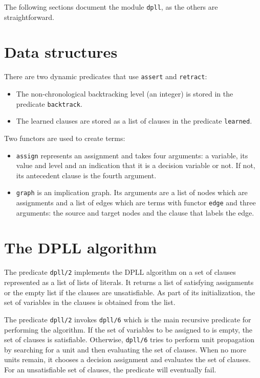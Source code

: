 \documentclass[11pt]{report}
\newcommand*{\p}[1]{\textup{\texttt{#1}}}
\begin{document}
The following sections document the module \p{dpll}, as the others are
straightforward.

\newpage

\section{Data structures}

There are two dynamic predicates that use \p{assert} and \p{retract}:
\begin{itemize}
\item The non-chronological backtracking level (an integer) is stored in the
predicate \p{backtrack}.

\item The learned clauses are stored as a list of
clauses in the predicate \p{learned}.
\end{itemize}

Two functors are used to create terms:
\begin{itemize}

\item \p{assign} represents an assignment and takes four arguments: a
variable, its value and level and an indication that it is a decision
variable or not. If not, its antecedent clause is the fourth argument.

\item \p{graph} is an implication graph. Its arguments are a list of
nodes which are assignments and a list of edges which are terms with
functor \p{edge} and three arguments: the source and target nodes
and the clause that labels the edge.
\end{itemize}


\section{The DPLL algorithm}

The predicate \p{dpll/2} implements the DPLL algorithm on a set of
clauses represented as a list of lists of literals. It returns a list of
satisfying assignments or the empty list if the clauses are
unsatisfiable. As part of its initialization, the set of variables in
the clauses is obtained from the list.

The predicate \p{dpll/2} invokes \p{dpll/6} which is the main recursive
predicate for performing the algorithm. If the set of variables to be
assigned to is empty, the set of clauses is satisfiable. Otherwise,
\p{dpll/6} tries to perform unit propagation by searching for a unit and
then evaluating the set of clauses. When no more units remain, it
chooses a decision assignment and evaluates the set of clauses.
For an unsatisfiable set of clauses, the predicate will eventually fail.
\end{document}
